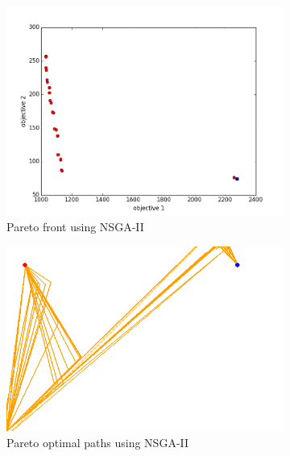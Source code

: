 \documentclass[conference]{IEEEtran}
\begin{document}
\begin{figure}
\begin{subfigure}[b]{0.45\linewidth}
		\includegraphics[width=\textwidth]{fig/sim3-2obj/PF03-MOPATH.png}
		\caption{Pareto front using NSGA-II}
		\label{fig:sim:norm:pf:a}
	\end{subfigure}
	\begin{subfigure}[b]{0.45\linewidth}
		\centering
		\includegraphics[width=\textwidth]{fig/sim3-2obj/MOPath01-ALL.png}
		\caption{Pareto optimal paths using NSGA-II}
		\label{fig:sim:norm:sols:a}
	\end{subfigure}  \\
	\begin{subfigure}[b]{0.45\linewidth}
		\centering

\end{subfigure}
\end{figure}
\end{document}
